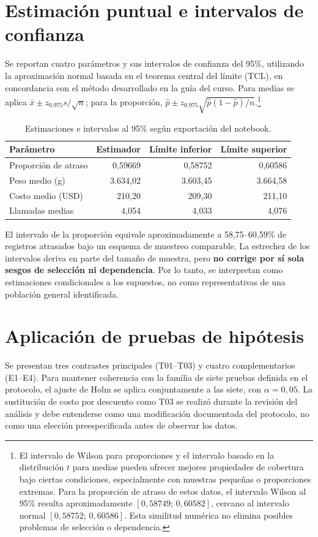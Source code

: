 \documentclass[11pt,a4paper]{article}
\begin{document}
\section{Estimación puntual e intervalos de confianza}
Se reportan cuatro parámetros y sus intervalos de confianza del 95\%, utilizando la aproximación normal basada en el teorema central del límite (TCL), en concordancia con el método desarrollado en la guía del curso. Para medias se aplica $\bar{x}\pm z_{0.975}s/\sqrt{n}$; para la proporción, $\hat{p}\pm z_{0.975}\sqrt{\hat{p}(1-\hat{p})/n}$.\footnote{El intervalo de Wilson para proporciones y el intervalo basado en la distribución $t$ para medias pueden ofrecer mejores propiedades de cobertura bajo ciertas condiciones, especialmente con muestras pequeñas o proporciones extremas. Para la proporción de atraso de estos datos, el intervalo Wilson al 95\% resulta aproximadamente $[0,58749;\,0,60582]$, cercano al intervalo normal $[0,58752;\,0,60586]$. Esta similitud numérica no elimina posibles problemas de selección o dependencia.}
\begin{table}[H]\centering\small\caption{Estimaciones e intervalos al 95\% según exportación del notebook.}\begin{tabularx}{\linewidth}{@{}Xrrr@{}}\toprule Parámetro & Estimador & Límite inferior & Límite superior\\\midrule
Proporción de atraso & 0,59669 & 0,58752 & 0,60586\\
Peso medio (g) & 3.634,02 & 3.603,45 & 3.664,58\\
Costo medio (USD) & 210,20 & 209,30 & 211,10\\
Llamadas medias & 4,054 & 4,033 & 4,076\\\bottomrule\end{tabularx}\end{table}
El intervalo de la proporción equivale aproximadamente a 58,75--60,59\% de registros atrasados bajo un esquema de muestreo comparable. La estrechez de los intervalos deriva en parte del tamaño de muestra, pero \textbf{no corrige por sí sola sesgos de selección ni dependencia}. Por lo tanto, se interpretan como estimaciones condicionales a los supuestos, no como representativas de una población general identificada.

\section{Aplicación de pruebas de hipótesis}
Se presentan tres contrastes principales (T01--T03) y cuatro complementarios (E1--E4). Para mantener coherencia con la familia de siete pruebas definida en el protocolo, el ajuste de Holm se aplica conjuntamente a las siete, con $\alpha=0,05$. La sustitución de costo por descuento como T03 se realizó durante la revisión del análisis y debe entenderse como una modificación documentada del protocolo, no como una elección preespecificada antes de observar los datos.
\end{document}
